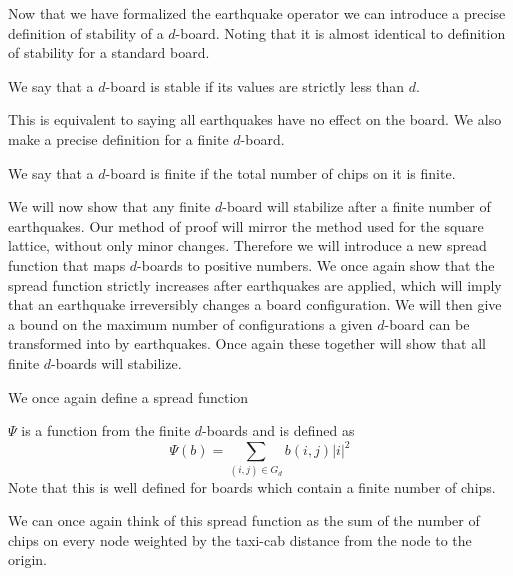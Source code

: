 \documentclass[runningheads,a4paper]{llncs}
\begin{document}
Now that we have formalized the earthquake operator we can introduce a precise definition of stability of a $d$-board. Noting that it is almost identical to definition of stability for a standard board. 
\begin{definition}
We say that a $d$-board is stable if its values are strictly less than $d$.
\end{definition}
This is equivalent to saying all earthquakes have no effect on the board. We also make a precise definition for a finite $d$-board.
\begin{definition} 
We say that a $d$-board is finite if the total number of chips on it is finite.
\end{definition}

We will now show that any finite $d$-board will stabilize after a finite number of earthquakes. Our method of proof will mirror the method used for the square lattice, without only minor changes.  Therefore we will introduce a new spread function that maps $d$-boards to positive numbers. We once again show that the spread function strictly increases after earthquakes are applied, which will imply that an earthquake irreversibly changes a board configuration. We will then give a bound on the maximum number of configurations a given $d$-board can be transformed into by earthquakes. Once again these together will show that all finite $d$-boards will stabilize.

We once again define a spread function 
\begin{definition}
$\Psi$ is a function from the finite $d$-boards and is defined as
\begin{equation*}
\Psi(b) = \sum_{(i,j) \in G_d} b(i,j) |i|^2
\end{equation*}
Note that this is well defined for boards which contain a finite number of chips. 
\end{definition} 
We can once again think of this spread function as the sum of the number of chips on every node weighted by the taxi-cab distance from the node to the origin. 
\end{document}
